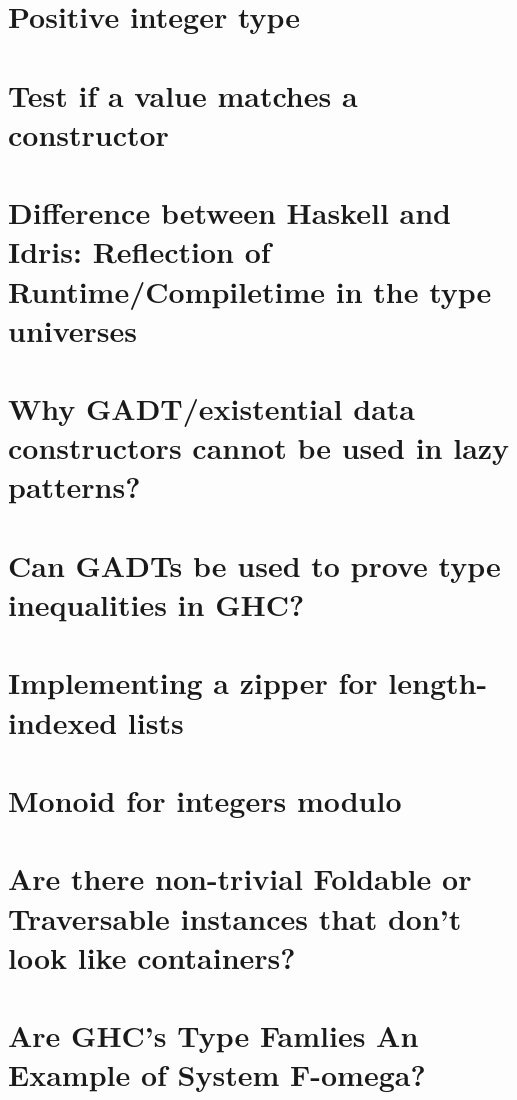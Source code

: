 \documentclass{book}%
\begin{document}
\section{Positive integer type}


\section{Test if a value matches a constructor}


\section{Difference between Haskell and Idris: Reflection of Runtime/Compiletime in the type universes}


\section{Why GADT/existential data constructors cannot be used in lazy patterns?}


\section{Can GADTs be used to prove type inequalities in GHC?}


\section{Implementing a zipper for length-indexed lists}


\section{Monoid for integers modulo}


\section{Are there non-trivial Foldable or Traversable instances that don't look like containers?}


\section{Are GHC's Type Famlies An Example of System F-omega?}

\end{document}
